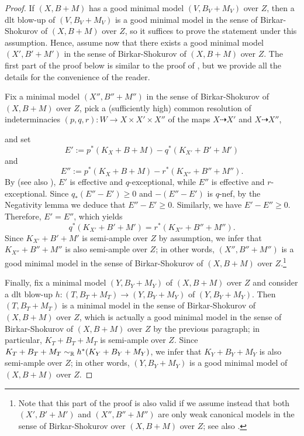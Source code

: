 	\begin{proof}		
		If $ (X,B+M) $ has a good minimal model $ (V,B_V+M_V) $ over $ Z $, then a dlt blow-up of $ (V,B_V+M_V) $ is a good minimal model in the sense of Birkar-Shokurov of $ (X,B+M) $ over $ Z $, so it suffices to prove the statement under this assumption. Hence, assume now that there exists a good minimal model $ (X',B'+M') $ in the sense of Birkar-Shokurov of $ (X,B+M) $ over $ Z $. The first part of the proof below is similar to the proof of \cite[Remark 2.7]{Bir12a}, but we provide all the details for the convenience of the reader.
		
		Fix a minimal model $ (X'',B'' + M'') $ in the sense of Birkar-Shokurov of $ (X,B+M) $ over $ Z $, pick a (sufficiently high) common resolution of indeterminacies $ (p,q,r) \colon W \to X \times X' \times X'' $ of the maps $ X \dashrightarrow X' $ and $ X \dashrightarrow X'' $, 
		\begin{center}
		\end{center}
		and set 
		\[ E' := p^* (K_X+B+M) - q^* (K_{X'} + B' + M') \]
		and
		\[ E'' := p^* (K_X+B+M) - r^* (K_{X''} + B'' + M'') . \]
		By \cite[Remark 2.6]{LT22b} (see also \cite[Remark 2.6]{Bir12a}), $ E' $ is effective and $ q $-exceptional, while $ E'' $ is effective and $ r $-exceptional. Since $ q_* (E'' - E') \geq 0 $ and $ -(E'' - E') $ is $ q $-nef, by the Negativity lemma we deduce that $ E'' - E' \geq 0 $. Similarly, we have $ E' - E'' \geq 0 $. Therefore, $ E' = E'' $, which yields
		\[ q^* (K_{X'} + B' + M') = r^* (K_{X''} + B'' + M'') . \]
		Since $ K_{X'} + B' + M' $ is semi-ample over $ Z $ by assumption, we infer that $ K_{X''} + B'' + M'' $ is also semi-ample over $ Z $; in other words, $ (X'',B'' + M'') $ is a good minimal model in the sense of Birkar-Shokurov of $ (X,B+M) $ over $ Z $.\footnote{Note that this part of the proof is also valid if we assume instead that both $ (X',B'+M') $ and $ (X'',B''+M'') $ are only weak canonical models in the sense of Birkar-Shokurov over $ (X,B+M) $ over $ Z $; see also \cite[Lemma 3.9]{HaconLiu21}.}
		
		Finally, fix a minimal model $ (Y,B_Y+M_Y) $ of $ (X,B+M) $ over $ Z $ and consider a dlt blow-up
		$ h \colon (T,B_T+M_T) \to (Y,B_Y+M_Y) $
		of $ (Y,B_Y+M_Y) $. Then $ (T,B_T+M_T) $ is a minimal model in the sense of Birkar-Shokurov of $ (X,B+M) $ over $ Z $, which is actually a good minimal model in the sense of Birkar-Shokurov of $ (X,B+M) $ over $ Z $ by the previous paragraph; in particular, $ K_T + B_T + M_T $ is semi-ample over $ Z $. Since $ K_T + B_T + M_T \sim_{\mathbb{R}} h^*(K_Y + B_Y + M_Y) $, we infer that $ K_Y + B_Y + M_Y $ is also semi-ample over $ Z $; in other words, $ (Y,B_Y+M_Y) $ is a good minimal model of $ (X,B+M) $ over $ Z $.
	\end{proof}
	

